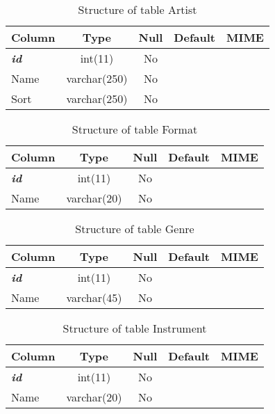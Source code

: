 \documentclass[10pt,a4paper,oneside,notitlepage]{article}
\begin{document}
%
%
 \begin{longtable}{|l|c|c|c|l|} 
 \caption{Structure of table Artist} \label{tab:Artist-structure} \\
 \hline \multicolumn{1}{|c|}{\textbf{Column}} & \multicolumn{1}{|c|}{\textbf{Type}} & \multicolumn{1}{|c|}{\textbf{Null}} & \multicolumn{1}{|c|}{\textbf{Default}} & \multicolumn{1}{|c|}{\textbf{MIME}} \\ \hline \hline
\textbf{\textit{id}} & int(11) & No &  &  \\ \hline 
Name & varchar(250) & No &  &  \\ \hline 
Sort & varchar(250) & No &  &  \\ \hline 
 \end{longtable}

%
%
 \begin{longtable}{|l|c|c|c|l|} 
 \caption{Structure of table Format} \label{tab:Format-structure} \\
 \hline \multicolumn{1}{|c|}{\textbf{Column}} & \multicolumn{1}{|c|}{\textbf{Type}} & \multicolumn{1}{|c|}{\textbf{Null}} & \multicolumn{1}{|c|}{\textbf{Default}} & \multicolumn{1}{|c|}{\textbf{MIME}} \\ \hline \hline
\textbf{\textit{id}} & int(11) & No &  &  \\ \hline 
Name & varchar(20) & No &  &  \\ \hline 
 \end{longtable}

%
%
 \begin{longtable}{|l|c|c|c|l|} 
 \caption{Structure of table Genre} \label{tab:Genre-structure} \\
 \hline \multicolumn{1}{|c|}{\textbf{Column}} & \multicolumn{1}{|c|}{\textbf{Type}} & \multicolumn{1}{|c|}{\textbf{Null}} & \multicolumn{1}{|c|}{\textbf{Default}} & \multicolumn{1}{|c|}{\textbf{MIME}} \\ \hline \hline
\textbf{\textit{id}} & int(11) & No &  &  \\ \hline 
Name & varchar(45) & No &  &  \\ \hline 
 \end{longtable}

\pagebreak 

%
%
 \begin{longtable}{|l|c|c|c|l|} 
 \caption{Structure of table Instrument} \label{tab:Instrument-structure} \\
 \hline \multicolumn{1}{|c|}{\textbf{Column}} & \multicolumn{1}{|c|}{\textbf{Type}} & \multicolumn{1}{|c|}{\textbf{Null}} & \multicolumn{1}{|c|}{\textbf{Default}} & \multicolumn{1}{|c|}{\textbf{MIME}} \\ \hline \hline
\textbf{\textit{id}} & int(11) & No &  &  \\ \hline 
Name & varchar(20) & No &  &  \\ \hline 
 \end{longtable}
\end{document}
